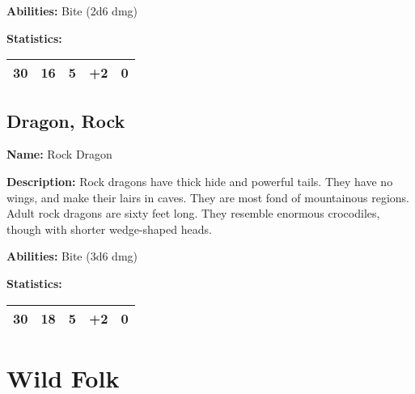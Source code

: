 \begin{multicols}{2}
\textbf{Abilities:} Bite (2d6 dmg)

\textbf{Statistics:}

\begin{center}
{
\begin{xtabular}{|l|l|l|l|l|}
30 & 16 & 5 & +2 & 0 \\
\hline
\end{xtabular}
}
\end{center}

\subsection{Dragon, Rock}

\textbf{Name:} Rock Dragon

\textbf{Description:} Rock dragons have thick hide and powerful tails. They have no
wings, and make their lairs in caves. They are most fond of mountainous regions. Adult
rock dragons are sixty feet long. They resemble enormous crocodiles, though with shorter
wedge-shaped heads.

\textbf{Abilities:} Bite (3d6 dmg)

\textbf{Statistics:}

\begin{center}
{
\begin{xtabular}{|l|l|l|l|l|}
30 & 18 & 5 & +2 & 0 \\
\hline
\end{xtabular}
}
\end{center}

\section{Wild Folk}


\end{multicols}
